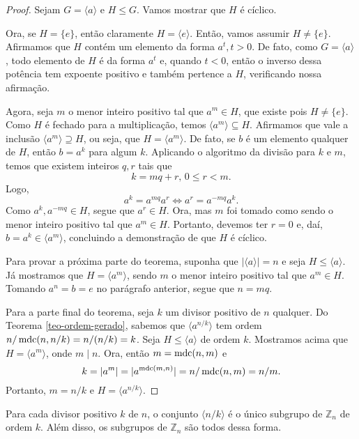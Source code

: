 \begin{proof}
    Sejam $G = \langle a \rangle$ e $H\leq G$. Vamos mostrar que $H$ é cíclico.
    
    Ora, se $H = \{e\}$, então claramente $H = \langle e \rangle$. Então, vamos assumir
    $H\neq\{e\}$. Afirmamos que $H$ contém um elemento da forma $a^t, t>0$. De fato,
    como $G = \langle a \rangle$, todo elemento de $H$ é da forma $a^t$ e, quando
    $t<0$, então o inverso dessa potência tem expoente positivo e também pertence a $H$,
    verificando nossa afirmação.
    
    Agora, seja $m$ o menor inteiro positivo tal que $a^m\in H$, que existe pois $H\neq\{e\}$.
    Como $H$ é fechado para a multiplicação, temos $\langle a^m \rangle\subseteq H$. Afirmamos
    que vale a inclusão $\langle a^m \rangle \supseteq H$, ou seja, que $H = \langle a^m \rangle$.
    De fato, se $b$ é um elemento qualquer de $H$, então $b = a^k$ para algum $k$. Aplicando o 
    algoritmo da divisão para $k$ e $m$, temos que existem inteiros $q,r$ tais que
    \[
    k = mq + r, \, 0\leq r < m.
    \]
    Logo,
    \[
    a^k = a^{mq}a^r \iff a^r = a^{-mq}a^k.
    \]
    Como $a^k, a^{-mq} \in H$, segue que $a^r \in H$. Ora, mas $m$ foi tomado como sendo o menor
    inteiro positivo tal que $a^m \in H$. Portanto, devemos ter $r = 0$ e, daí, $b = a^k \in \langle a^m \rangle$,
    concluindo a demonstração de que $H$ é cíclico.
    
    Para provar a próxima parte do teorema, suponha que $|\langle a \rangle| = n$ e seja $H\leq\langle a \rangle$.
    Já mostramos que $H = \langle a^m \rangle$, sendo $m$ o menor inteiro positivo tal que $a^m\in H$.
    Tomando $a^n = b = e$ no parágrafo anterior, segue que $n = mq$.
    
    Para a parte final do teorema, seja $k$ um divisor positivo de $n$ qualquer. Do Teorema \ref{teo-ordem-gerado},
    sabemos que $\langle a^{n/k} \rangle$ tem ordem $n/\operatorname{mdc}(n,n/k) = n/(n/k) = k$. Seja $H\leq\langle a \rangle$
    de ordem $k$. Mostramos acima que $H = \langle a^m \rangle$, onde $m\mid n$. Ora, então $m = \operatorname{mdc}(n,m)$ e
    \[
    k = |a^m| = |a^{\operatorname{mdc}(m,n)}| = n/\operatorname{mdc}(n,m) = n/m.
    \]
    Portanto, $m = n/k$ e $H = \langle a^{n/k} \rangle$.
\end{proof}
%
\begin{corollary}
\label{cor-subgrupos-Zn}
    Para cada divisor positivo $k$ de $n$, o conjunto $\langle n/k \rangle$ é o único subgrupo
    de $\mathbb{Z}_n$ de ordem $k$. Além disso, os subgrupos de $\mathbb{Z}_n$ são todos dessa
    forma.
\end{corollary}

